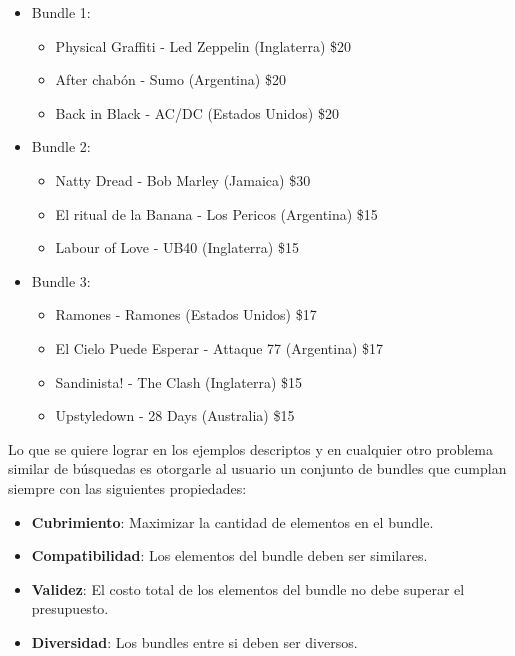 \begin{itemize}
  \item Bundle 1:
  \begin{itemize}
    \item Physical Graffiti - Led Zeppelin (Inglaterra) \$20
    \item After chabón - Sumo (Argentina) \$20
    \item Back in Black - AC/DC (Estados Unidos) \$20
  \end{itemize}
  \item Bundle 2:
  \begin{itemize}
    \item Natty Dread - Bob Marley (Jamaica) \$30
    \item El ritual de la Banana - Los Pericos (Argentina) \$15
    \item Labour of Love - UB40 (Inglaterra) \$15
  \end{itemize}
	  \item Bundle 3:
  \begin{itemize}
    \item Ramones - Ramones (Estados Unidos) \$17
    \item El Cielo Puede Esperar - Attaque 77 (Argentina) \$17
    \item Sandinista! - The Clash (Inglaterra) \$15
		\item Upstyledown - 28 Days (Australia) \$15
  \end{itemize}
\end{itemize}
Lo que se quiere lograr en los ejemplos descriptos y en cualquier otro problema similar de búsquedas es otorgarle al usuario un conjunto de bundles que cumplan siempre con las siguientes propiedades: 
\begin{itemize}
  \item \textbf{Cubrimiento}: Maximizar la cantidad de elementos en el bundle.
  \item \textbf{Compatibilidad}: Los elementos del bundle deben ser similares.
  \item \textbf{Validez}: El costo total de los elementos del bundle no debe superar el presupuesto.
  \item \textbf{Diversidad}: Los bundles entre si deben ser diversos.
\end{itemize}
